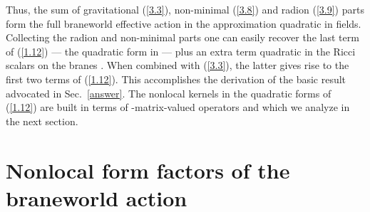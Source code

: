 \documentclass[a4paper,preprint,nofootinbib,
                 showpacs,preprintnumbers,amsmath,amssymb]{revtex4}
\begin{document}
    Thus, the sum of gravitational (\ref{3.3}), non-minimal (\ref{3.8}) and 
    radion (\ref{3.9}) parts form the full braneworld effective action in the 
    approximation quadratic in fields.  Collecting the radion and non-minimal 
    parts one can easily recover the last term of (\ref{1.12}) --- the 
  \coordHE{} quadratic form in \coordHE{} --- plus an extra 
    term quadratic in the Ricci scalars on the branes \coordHE{}. 
When combined with 
    (\ref{3.3}), the latter gives rise to the first two terms of (\ref{1.12}). 
    This accomplishes the derivation of the basic result advocated in 
    Sec.~\ref{answer}. The nonlocal kernels in the quadratic forms of 
    (\ref{1.12}) are built in terms of \coordHE{}-matrix-valued operators \coordHE{} and \coordHE{} which we analyze in the next section. 
 
\section{Nonlocal form factors of the braneworld action\label{green}} 
 
\end{document}
